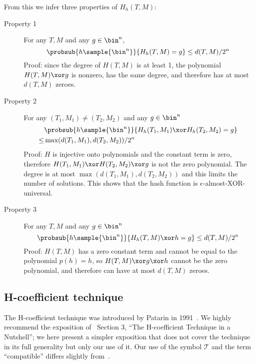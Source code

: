 \documentclass[letterpaper,11pt]{article}
\begin{document}
From this we infer three properties of \(H_h(T, M)\):
\begin{description}
    \item[Property 1]
    For any \(T, M\) and any \(g \in \bin^n\),
    \begin{displaymath}
        \probsub{h\sample{\bin^n}}{H_h(T, M) = g} \leq d(T, M)/2^n
    \end{displaymath}
    Proof: since the degree of \(H(T, M)\) is at least 1,
    the polynomial \(H(T, M) \xor g\) 
    is nonzero,
    has the same degree,
    and therefore has at most \(d(T, M)\) zeroes.
    \item[Property 2] 
    For any \((T_1, M_1) \neq (T_2, M_2)\) and any \(g \in \bin^n\)
    \begin{align*}
        & \probsub{h\sample{\bin^n}}{H_h(T_1, M_1) \xor H_h(T_2, M_2) = g} \\
        \leq  & \max(d(T_1, M_1), d(T_2, M_2))/2^n
    \end{align*}
    Proof: \(H\) is injective onto polynomials
    and the constant term is zero, therefore
    \(H(T_1, M_1) \xor H(T_2, M_2) \xor g\)
    is not the zero polynomial.
    The degree is at most \(\max(d(T_1, M_1), d(T_2, M_2))\)
    and this limits the number of solutions.
    This shows that the hash function is
    \(\epsilon\)-almost-XOR-universal.
    \item[Property 3]
    For any \(T, M\) and any \(g \in \bin^n\)
    \begin{displaymath}
        \probsub{h\sample{\bin^n}}{H_h(T, M) \xor h = g} \leq d(T, M)/2^n
    \end{displaymath}
    Proof: \(H(T, M)\) has a zero constant term and
    cannot be equal to the polynomial \(p(h) = h\),
    so \(H(T, M) \xor g \xor h\) cannot be the zero polynomial, and
    therefore can have at most \(d(T, M)\) zeroes.
\end{description}

\subsection{H-coefficient technique}
The H-coefficient technique was introduced by Patarin in 1991~\cite{ppdes,hco}.
We highly recommend the exposition
of~\cite{hco2} Section 3,
``The H-coefficient Technique in a Nutshell'';
we here present a simpler exposition that
does not cover the technique in its full
generality but only our use of it.
Our use of the symbol \(\mathcal{T}\) and the term
``compatible'' differs slightly from~\cite{hco2}.
\end{document}
